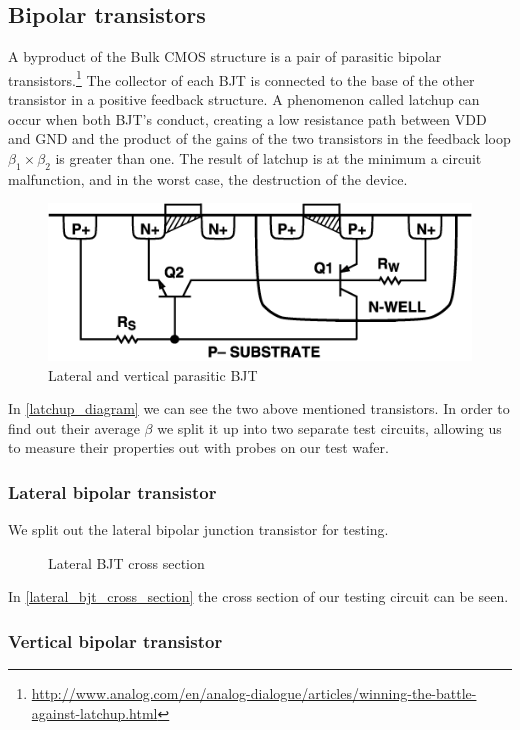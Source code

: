 \subsection{Bipolar transistors}
A byproduct of the Bulk CMOS structure is a pair of parasitic bipolar transistors.\footnote{\url{http://www.analog.com/en/analog-dialogue/articles/winning-the-battle-against-latchup.html}}
The collector of each BJT is connected to the base of the other transistor in a positive feedback structure.
A phenomenon called latchup can occur when both BJT's conduct, creating a low resistance path between VDD and GND and the product of the gains of the two transistors in the feedback loop $\beta_1 \times \beta_2$ is greater than one.
The result of latchup is at the minimum a circuit malfunction, and in the worst case, the destruction of the device.

\begin{figure}[H]
	\centering
	\includegraphics[scale=0.5]{latchup_cross.png}
	\caption{Lateral and vertical parasitic BJT}
	\label{latchup_diagram}
\end{figure}

In \autoref{latchup_diagram} we can see the two above mentioned transistors. In order to find out their average $\beta$ we split it up into two separate test circuits, allowing us to measure their properties out with probes on our test wafer.

\subsubsection{Lateral bipolar transistor}

We split out the lateral bipolar junction transistor for testing.

\begin{figure}[H]
	\centering
	\begin{tikzpicture}[node distance = 3cm, auto, thick,scale=0.5, every node/.style={transform shape}]
		
	\end{tikzpicture}
	\caption{Lateral BJT cross section}
	\label{lateral_bjt_cross_section}
\end{figure}

In \autoref{lateral_bjt_cross_section} the cross section of our testing circuit can be seen.

\subsubsection{Vertical bipolar transistor}